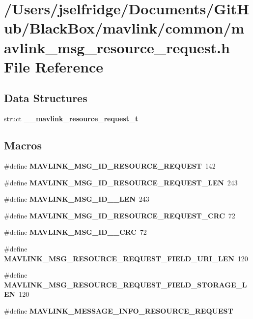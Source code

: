 \section{/\+Users/jselfridge/\+Documents/\+Git\+Hub/\+Black\+Box/mavlink/common/mavlink\+\_\+msg\+\_\+resource\+\_\+request.h File Reference}
\label{mavlink__msg__resource__request_8h}
\subsection*{Data Structures}
\begin{DoxyCompactItemize}
\item 
struct \textbf{ \+\_\+\+\_\+mavlink\+\_\+resource\+\_\+request\+\_\+t}
\end{DoxyCompactItemize}
\subsection*{Macros}
\begin{DoxyCompactItemize}
\item 
\#define \textbf{ M\+A\+V\+L\+I\+N\+K\+\_\+\+M\+S\+G\+\_\+\+I\+D\+\_\+\+R\+E\+S\+O\+U\+R\+C\+E\+\_\+\+R\+E\+Q\+U\+E\+ST}~142
\item 
\#define \textbf{ M\+A\+V\+L\+I\+N\+K\+\_\+\+M\+S\+G\+\_\+\+I\+D\+\_\+\+R\+E\+S\+O\+U\+R\+C\+E\+\_\+\+R\+E\+Q\+U\+E\+S\+T\+\_\+\+L\+EN}~243
\item 
\#define \textbf{ M\+A\+V\+L\+I\+N\+K\+\_\+\+M\+S\+G\+\_\+\+I\+D\+\_\+\_\+\+L\+EN}~243
\item 
\#define \textbf{ M\+A\+V\+L\+I\+N\+K\+\_\+\+M\+S\+G\+\_\+\+I\+D\+\_\+\+R\+E\+S\+O\+U\+R\+C\+E\+\_\+\+R\+E\+Q\+U\+E\+S\+T\+\_\+\+C\+RC}~72
\item 
\#define \textbf{ M\+A\+V\+L\+I\+N\+K\+\_\+\+M\+S\+G\+\_\+\+I\+D\+\_\+\_\+\+C\+RC}~72
\item 
\#define \textbf{ M\+A\+V\+L\+I\+N\+K\+\_\+\+M\+S\+G\+\_\+\+R\+E\+S\+O\+U\+R\+C\+E\+\_\+\+R\+E\+Q\+U\+E\+S\+T\+\_\+\+F\+I\+E\+L\+D\+\_\+\+U\+R\+I\+\_\+\+L\+EN}~120
\item 
\#define \textbf{ M\+A\+V\+L\+I\+N\+K\+\_\+\+M\+S\+G\+\_\+\+R\+E\+S\+O\+U\+R\+C\+E\+\_\+\+R\+E\+Q\+U\+E\+S\+T\+\_\+\+F\+I\+E\+L\+D\+\_\+\+S\+T\+O\+R\+A\+G\+E\+\_\+\+L\+EN}~120
\item 
\#define \textbf{ M\+A\+V\+L\+I\+N\+K\+\_\+\+M\+E\+S\+S\+A\+G\+E\+\_\+\+I\+N\+F\+O\+\_\+\+R\+E\+S\+O\+U\+R\+C\+E\+\_\+\+R\+E\+Q\+U\+E\+ST}
\end{DoxyCompactItemize}
